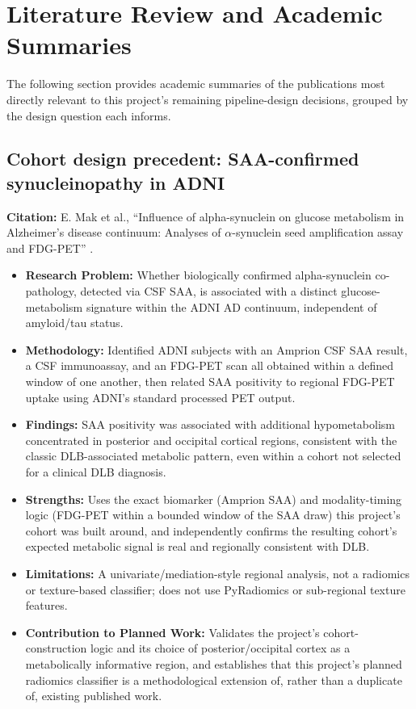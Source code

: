 \section{Literature Review and Academic Summaries}
\label{sec:literature_review}

The following section provides academic summaries of the publications most directly relevant to this project's remaining pipeline-design decisions, grouped by the design question each informs.

\subsection{Cohort design precedent: SAA-confirmed synucleinopathy in ADNI}
\textbf{Citation:} E. Mak et al., ``Influence of alpha-synuclein on glucose metabolism in Alzheimer's disease continuum: Analyses of $\alpha$-synuclein seed amplification assay and FDG-PET'' \cite{mak2025alphasynuclein}.

\begin{itemize}
    \item \textbf{Research Problem:} Whether biologically confirmed alpha-synuclein co-pathology, detected via CSF SAA, is associated with a distinct glucose-metabolism signature within the ADNI AD continuum, independent of amyloid/tau status.
    \item \textbf{Methodology:} Identified ADNI subjects with an Amprion CSF SAA result, a CSF immunoassay, and an FDG-PET scan all obtained within a defined window of one another, then related SAA positivity to regional FDG-PET uptake using ADNI's standard processed PET output.
    \item \textbf{Findings:} SAA positivity was associated with additional hypometabolism concentrated in posterior and occipital cortical regions, consistent with the classic DLB-associated metabolic pattern, even within a cohort not selected for a clinical DLB diagnosis.
    \item \textbf{Strengths:} Uses the exact biomarker (Amprion SAA) and modality-timing logic (FDG-PET within a bounded window of the SAA draw) this project's cohort was built around, and independently confirms the resulting cohort's expected metabolic signal is real and regionally consistent with DLB.
    \item \textbf{Limitations:} A univariate/mediation-style regional analysis, not a radiomics or texture-based classifier; does not use PyRadiomics or sub-regional texture features.
    \item \textbf{Contribution to Planned Work:} Validates the project's cohort-construction logic and its choice of posterior/occipital cortex as a metabolically informative region, and establishes that this project's planned radiomics classifier is a methodological extension of, rather than a duplicate of, existing published work.
\end{itemize}

